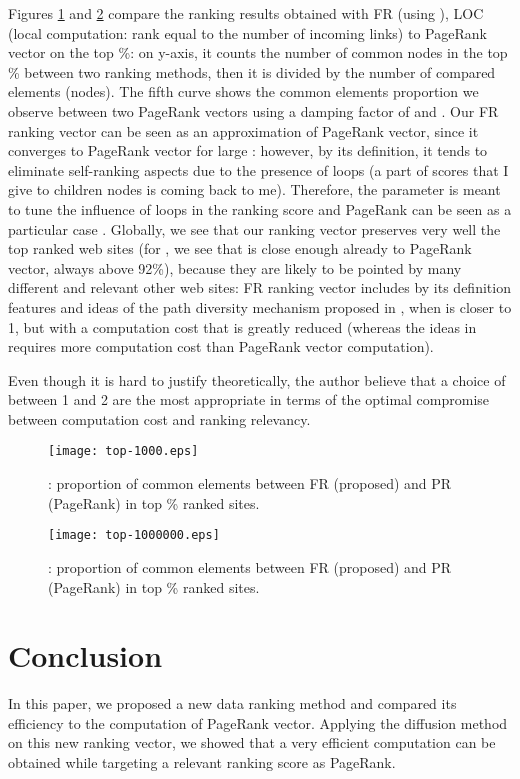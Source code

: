 \documentclass[conference]{IEEEtran}
\begin{document}
\begin{psfrags}
Figures \ref{fig:top3} and \ref{fig:top6} compare the ranking results obtained with FR (using ), 
LOC (local computation: rank equal to the number of incoming links) to PageRank vector on the top \%: 
on y-axis, it counts the number of common nodes in the top \% between two ranking methods, then it is divided by
the number of compared elements (nodes). 
The fifth curve shows the common elements proportion we observe between two PageRank vectors using a damping factor of  and .
Our FR ranking vector can be seen as an approximation of PageRank vector, since it converges to PageRank vector
for large : however, by its definition,
it tends to eliminate self-ranking aspects due to the presence of loops (a part of scores that I give to children nodes
is coming back to me). Therefore, the parameter  is meant to tune the influence of loops in the ranking score
and PageRank can be seen as a particular case .
Globally, we see that our ranking vector preserves very well the top ranked web sites
(for , we see that  is close enough already to PageRank vector, always above 92\%), because they
are likely to be pointed by many different and relevant other web sites: FR ranking vector
includes by its definition features and ideas of the path diversity mechanism proposed in \cite{diversity},
when  is closer to 1, but with a computation cost that is greatly reduced (whereas the ideas in \cite{diversity}
requires more computation cost than PageRank vector computation).


Even though it is hard to justify theoretically, the author believe that a choice of 
between 1 and 2 are the most appropriate in terms of the optimal compromise between computation
cost and ranking relevancy.



\begin{figure}[htbp]
\centering
\texttt{[image: top-1000.eps]}
\caption{: proportion of common elements between FR (proposed) and PR (PageRank) in top \% ranked sites.}
\label{fig:top3}
\end{figure}

\begin{figure}[htbp]
\centering
\texttt{[image: top-1000000.eps]}
\caption{: proportion of common elements between FR (proposed) and PR (PageRank) in top \% ranked sites.}
\label{fig:top6}
\end{figure}

\section{Conclusion}\label{sec:conclusion}
In this paper, we proposed a new data ranking method and compared its efficiency
to the computation of PageRank vector. Applying the diffusion method on this
new ranking vector, we showed that a very efficient computation can be obtained
while targeting a relevant ranking score as PageRank.

\end{psfrags}


\end{document}

